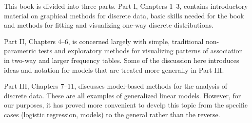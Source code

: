 
This book is divided into three parts. Part I, Chapters 1--3, contains 
introductory material on graphical methods for discrete data, 
basic \R skills needed for the book and methods for fitting
and visualizing one-way discrete distributions.

Part II, Chapters 4--6, is concerned largely with 
simple, traditional non-parametric tests and exploratory methods for
visualizing patterns of association in two-way and larger frequency tables.
Some of the discussion here introduces ideas and notation for \loglin
models that are treated more generally in Part III.

Part III, Chapters 7--11, discusses model-based methods for the
analysis of discrete data.  These are all examples of generalized
linear models.  However, for our purposes, it has proved more convenient
to develp this topic from the specific cases (logistic regression, \loglin models)
to the general rather than the reverse.

